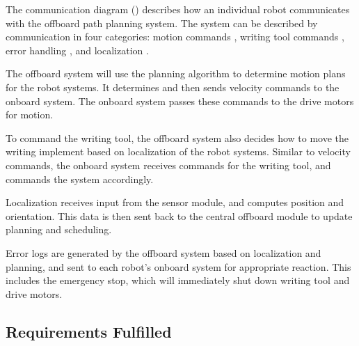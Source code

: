 The communication diagram () describes how an individual robot communicates with the offboard path planning system. The system can be described by communication in four categories: motion commands , writing tool commands , error handling , and localization .

The offboard system will use the planning algorithm to determine motion plans for the robot systems. It determines and then sends velocity commands to the onboard system. The onboard system passes these commands to the drive motors for motion.

To command the writing tool, the offboard system also decides how to move the writing implement based on localization of the robot systems. Similar to velocity commands, the onboard system receives commands for the writing tool, and commands the system accordingly.

Localization receives input from the sensor module, and computes position and orientation. This data is then sent back to the central offboard module to update planning and scheduling.

Error logs are generated by the offboard system based on localization and planning, and sent to each robot's onboard system for appropriate reaction. This includes the emergency stop, which will immediately shut down writing tool and drive motors.

\subsection{Requirements Fulfilled}
